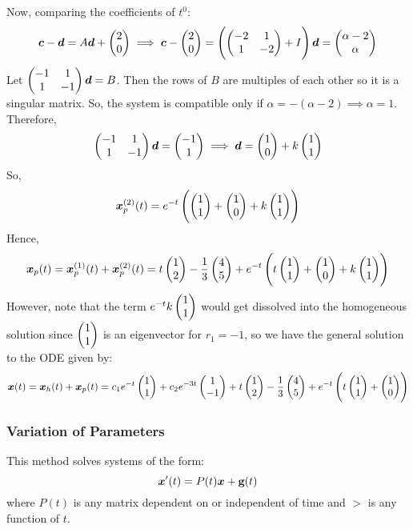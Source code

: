\begin{eg}
	Now, comparing the coefficients of $t^0$:
	\[
	\bm{c} - \bm{d} = A\bm{d} + \begin{pmatrix}2\\0\end{pmatrix}
	\implies \bm{c} - \begin{pmatrix}2\\0\end{pmatrix} = \left(\begin{pmatrix}-2&1 \\ 1&-2\end{pmatrix} + I\right)\bm{d} = \begin{pmatrix}\alpha-2\\\alpha\end{pmatrix}
	\]
	Let $\begin{pmatrix}-1&1 \\ 1&-1\end{pmatrix}\bm{d} =B$. Then the rows of $B$ are multiples of each other so it is a singular matrix. So, the system is compatible only if $\alpha = -(\alpha - 2) \implies \alpha = 1$. Therefore,
	\[
	\begin{pmatrix}-1&1 \\ 1&-1\end{pmatrix}\bm{d} = \begin{pmatrix}-1\\1\end{pmatrix} \implies \bm{d} = \begin{pmatrix}1\\0\end{pmatrix} + k\begin{pmatrix}1\\1\end{pmatrix}
	\]
	So,
	\[\bm{x}_p^{(2)}(t) = e^{-t}\left(\begin{pmatrix}1\\1\end{pmatrix} + \begin{pmatrix}1\\0\end{pmatrix} + k\begin{pmatrix}1\\1\end{pmatrix}\right)
	\]
	Hence, 
	\[
	\bm{x}_p(t) = \bm{x}_p^{(1)}(t) + \bm{x}_p^{(2)}(t) = t\begin{pmatrix}1\\2\end{pmatrix} - \frac{1}{3}\begin{pmatrix}4\\5\end{pmatrix} + e^{-t}\left(t\begin{pmatrix}1\\1\end{pmatrix} + \begin{pmatrix}1\\0\end{pmatrix} + k\begin{pmatrix}1\\1\end{pmatrix}\right)
	\]
	However, note that the term $e^{-t}k\begin{pmatrix}1\\1\end{pmatrix}$ would get dissolved into the homogeneous solution since $\begin{pmatrix}1\\1\end{pmatrix}$ is an eigenvector for $r_1 = -1$, so we have the general solution to the ODE given by:
	\[
	\bm{x}(t) = \bm{x}_h(t) + \bm{x}_p(t) = c_1e^{-t}\begin{pmatrix}1\\1\end{pmatrix} + c_2e^{-3t}\begin{pmatrix}1\\-1\end{pmatrix} + t\begin{pmatrix}1\\2\end{pmatrix} - \frac{1}{3}\begin{pmatrix}4\\5\end{pmatrix} + e^{-t}\left(t\begin{pmatrix}1\\1\end{pmatrix} + \begin{pmatrix}1\\0\end{pmatrix} \right)
	\]
\end{eg}


\subsubsection{Variation of Parameters}

This method solves systems of the form: 
\begin{equation}\label{eq1.7.10}
	\bm{x}'(t) = P(t)\bm{x} + \textbf{g}(t)
\end{equation}
where $P(t)$ is any matrix dependent on or independent of time and $\gt$ is any function of $t$.

